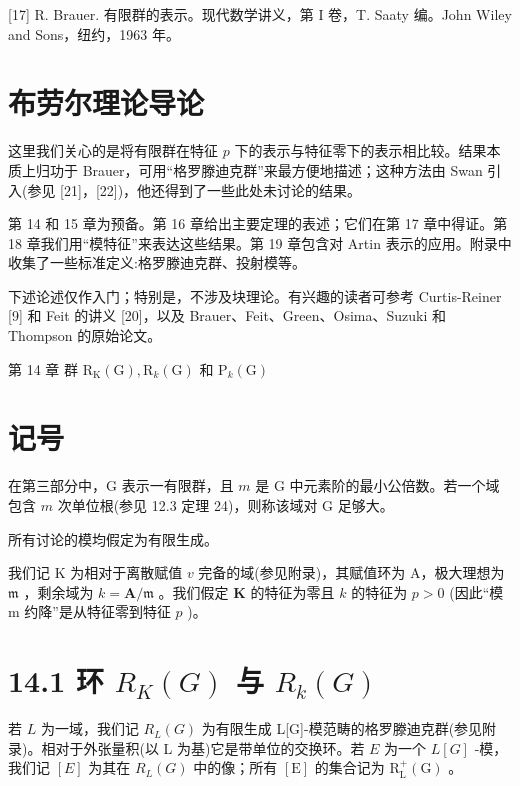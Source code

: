 \documentclass[10pt]{article}
\begin{document}
[17] R. Brauer. 有限群的表示。现代数学讲义，第 I 卷，T. Saaty 编。John Wiley and Sons，纽约，1963 年。

\section*{布劳尔理论导论}

这里我们关心的是将有限群在特征 \(p\) 下的表示与特征零下的表示相比较。结果本质上归功于 Brauer，可用“格罗滕迪克群”来最方便地描述；这种方法由 Swan 引入(参见 [21]，[22])，他还得到了一些此处未讨论的结果。

第 14 和 15 章为预备。第 16 章给出主要定理的表述；它们在第 17 章中得证。第 18 章我们用“模特征”来表达这些结果。第 19 章包含对 Artin 表示的应用。附录中收集了一些标准定义:格罗滕迪克群、投射模等。

下述论述仅作入门；特别是，不涉及块理论。有兴趣的读者可参考 Curtis-Reiner [9] 和 Feit 的讲义 [20]，以及 Brauer、Feit、Green、Osima、Suzuki 和 Thompson 的原始论文。

第 14 章 群 \({\mathrm{R}}_{\mathrm{K}}\left( \mathrm{G}\right) ,{\mathrm{R}}_{k}\left( \mathrm{G}\right)\) 和 \({\mathrm{P}}_{k}\left( \mathrm{G}\right)\)

\section*{记号}

在第三部分中，G 表示一有限群，且 \(m\) 是 G 中元素阶的最小公倍数。若一个域包含 \(m\) 次单位根(参见 12.3 定理 24)，则称该域对 G 足够大。

所有讨论的模均假定为有限生成。

我们记 \(\mathrm{K}\) 为相对于离散赋值 \(v\) 完备的域(参见附录)，其赋值环为 A，极大理想为 \(\mathfrak{m}\) ，剩余域为 \(k = \mathbf{A}/\mathfrak{m}\) 。我们假定 \(\mathbf{K}\) 的特征为零且 \(k\) 的特征为 \(p > 0\) (因此“模 m 约降”是从特征零到特征 \(p\) )。

\section*{14.1 环 \({R}_{K}\left( G\right)\) 与 \({R}_{k}\left( G\right)\)}

若 \(L\) 为一域，我们记 \({R}_{L}\left( G\right)\) 为有限生成 L[G]-模范畴的格罗滕迪克群(参见附录)。相对于外张量积(以 L 为基)它是带单位的交换环。若 \(E\) 为一个 \(L\left\lbrack  G\right\rbrack\) -模，我们记 \(\left\lbrack  E\right\rbrack\) 为其在 \({R}_{L}\left( G\right)\) 中的像；所有 \(\left\lbrack  \mathrm{E}\right\rbrack\) 的集合记为 \({\mathrm{R}}_{\mathrm{L}}^{ + }\left( \mathrm{G}\right)\) 。
\end{document}
